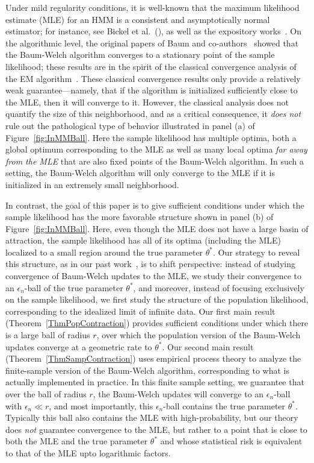 \documentclass[twoside,11pt]{article}
\newcommand{\numobs}{\ensuremath{n}}
\newcommand{\thetastar}{\ensuremath{\theta^*}}
\newcommand{\myciteyear}[1]{(\citeyear{#1})}
\begin{document}
Under mild regularity conditions, it is well-known that the maximum
likelihood estimate (MLE) for an HMM is a consistent and
asymptotically normal estimator; for instance, see Bickel et
al.~\myciteyear{bickel1998}, as well as the expository
works~\citep{Moulines_HMM, vanHandel_HMM}.  On the algorithmic level,
the original papers of Baum and co-authors~\citep{Baum70, baum1966}
showed that the Baum-Welch algorithm converges to a stationary point
of the sample likelihood; these results are in the spirit of the
classical convergence analysis of the EM algorithm~\citep{Wu83,
  Dempster77}.  These classical convergence results only provide a
relatively weak guarantee---namely, that if the algorithm is
initialized sufficiently close to the MLE, then it will converge to
it.  However, the classical analysis does not quantify the size of
this neighborhood, and as a critical consequence, it \emph{does not}
rule out the pathological type of behavior illustrated in panel (a) of
Figure~\ref{fig:InMMBall}.  Here the sample likelihood has multiple
optima, both a global optimum corresponding to the MLE as well as many
local optima \emph{far away from the MLE} that are also fixed points
of the Baum-Welch algorithm.  In such a setting, the Baum-Welch
algorithm will only converge to the MLE if it is initialized in an
extremely small neighborhood.

In contrast, the goal of this paper is to give sufficient conditions
under which the sample likelihood has the more favorable structure
shown in panel (b) of Figure~\ref{fig:InMMBall}.  Here, even though
the MLE does not have a large basin of attraction, the sample
likelihood has all of its optima (including the MLE) localized to a
small region around the true parameter $\thetastar$.  Our strategy to
reveal this structure, as in our past work~\citep{BalWaiYu14}, is to
shift perspective: instead of studying convergence of Baum-Welch
updates to the MLE, we study their convergence to an
$\epsilon_\numobs$-ball of the true parameter $\thetastar$, and
moreover, instead of focusing exclusively on the sample likelihood, we
first study the structure of the population likelihood, corresponding
to the idealized limit of infinite data.  Our first main result
(Theorem~\ref{ThmPopContraction}) provides sufficient conditions under
which there is a large ball of radius $r$, over which the population
version of the Baum-Welch updates converge at a geometric rate to
$\thetastar$.  Our second main result
(Theorem~\ref{ThmSampContraction}) uses empirical process theory to
analyze the finite-sample version of the Baum-Welch algorithm,
corresponding to what is actually implemented in practice.  In this
finite sample setting, we guarantee that over the ball of radius $r$,
the Baum-Welch updates will converge to an $\epsilon_\numobs$-ball
with $\epsilon_\numobs \ll r$, and most importantly, this
$\epsilon_\numobs$-ball contains the true parameter $\thetastar$.  Typically this ball 
also contains the MLE with high-probability, but our theory does \emph{not}
guarantee convergence to the MLE, but rather to a point that is close
to both the MLE and the true parameter $\thetastar$ and whose statistical risk is equivalent to that 
of the MLE upto logarithmic factors.
\end{document}
